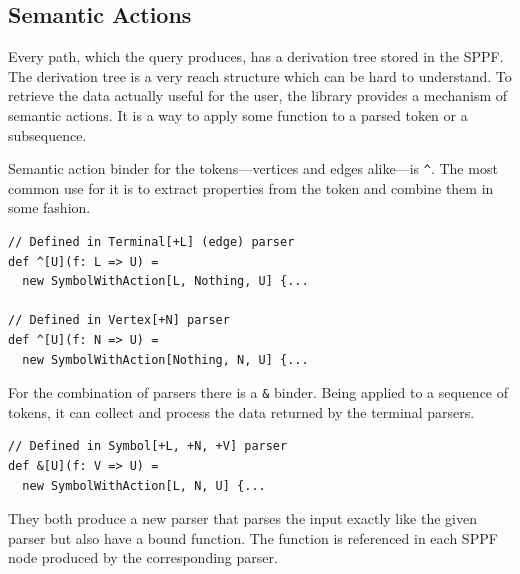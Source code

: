 \subsection{Semantic Actions}
\label{sec:semanticActions}

Every path, which the query produces, has a derivation tree stored in the SPPF. 
The derivation tree is a very reach structure which can be hard to understand. 
To retrieve the data actually useful for the user, the library provides a mechanism of semantic actions. 
It is a way to apply some function to a parsed token or a subsequence. 


Semantic action binder for the tokens---vertices and edges alike---is \lstinline{^}. The most common use for it is to extract properties from the token and combine them in some fashion. 

\begin{lstlisting}
// Defined in Terminal[+L] (edge) parser
def ^[U](f: L => U) = 
  new SymbolWithAction[L, Nothing, U] {...
  
// Defined in Vertex[+N] parser
def ^[U](f: N => U) = 
  new SymbolWithAction[Nothing, N, U] {...
\end{lstlisting}

For the combination of parsers there is a \lstinline{&} binder. Being  applied to a sequence of tokens, it can collect and process the data returned by the terminal parsers.
\begin{lstlisting}
// Defined in Symbol[+L, +N, +V] parser
def &[U](f: V => U) = 
  new SymbolWithAction[L, N, U] {...
\end{lstlisting}

They both produce a new parser that parses the input exactly like the given parser but also have a bound function.
The function is referenced in each SPPF node produced by the corresponding parser.

